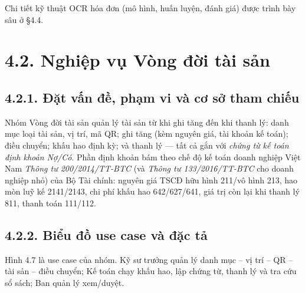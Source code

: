 Chi tiết kỹ thuật OCR hóa đơn (mô hình, huấn luyện, đánh giá) được trình bày sâu ở §4.4.

\section*{4.2. Nghiệp vụ Vòng đời tài sản}
\subsection*{4.2.1. Đặt vấn đề, phạm vi và cơ sở tham chiếu}
Nhóm Vòng đời tài sản quản lý tài sản từ khi ghi tăng đến khi thanh lý: danh mục loại tài sản, vị trí, mã QR; ghi tăng (kèm nguyên giá, tài khoản kế toán); điều chuyển; khấu hao định kỳ; và thanh lý — tất cả gắn với \emph{chứng từ kế toán định khoản Nợ/Có}. Phần định khoản bám theo chế độ kế toán doanh nghiệp Việt Nam \emph{Thông tư 200/2014/TT-BTC} (và \emph{Thông tư 133/2016/TT-BTC} cho doanh nghiệp nhỏ) của Bộ Tài chính: nguyên giá TSCĐ hữu hình 211/vô hình 213, hao mòn luỹ kế 2141/2143, chi phí khấu hao 642/627/641, giá trị còn lại khi thanh lý 811, thanh toán 111/112.


\subsection*{4.2.2. Biểu đồ use case và đặc tả}
Hình 4.7 là use case của nhóm. Kỹ sư trưởng quản lý danh mục -- vị trí -- QR -- tài sản -- điều chuyển; Kế toán chạy khấu hao, lập chứng từ, thanh lý và tra cứu sổ sách; Ban quản lý xem/duyệt.

